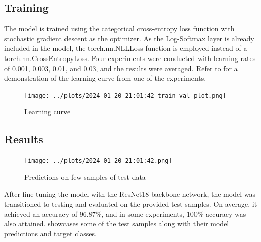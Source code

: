 \subsection{Training}
    
    The model is trained using the categorical cross-entropy loss function with stochastic gradient descent as the optimizer. As the Log-Softmax layer is already included in the model, the torch.nn.NLLLoss function is employed instead of a torch.nn.CrossEntropyLoss. Four experiments were conducted with learning rates of 0.001, 0.003, 0.01, and 0.03, and the results were averaged. Refer to  for a demonstration of the learning curve from one of the experiments.

    \begin{figure}[htbp]
        \centering
        \texttt{[image: ../plots/2024-01-20 21:01:42-train-val-plot.png]}
        \caption{Learning curve}
        \label{fig:learning-curve}
    \end{figure}

\subsection{Results}

    \begin{figure}[!htbp]
        \centering
        \texttt{[image: ../plots/2024-01-20 21:01:42.png]}
        \caption{Predictions on few samples of test data}
        \label{fig:results}
    \end{figure} 

    After fine-tuning the model with the ResNet18 backbone network, the model was transitioned to testing and evaluated on the provided test samples. On average, it achieved an accuracy of $96.87\%$, and in some experiments, $100\%$ accuracy was also attained.  showcases some of the test samples along with their model predictions and target classes.

